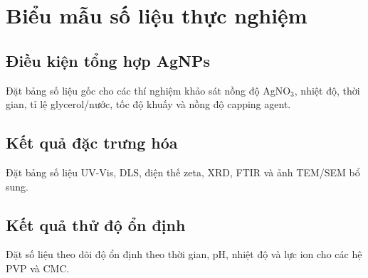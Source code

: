 \chapter{Biểu mẫu số liệu thực nghiệm}

\section{Điều kiện tổng hợp AgNPs}
Đặt bảng số liệu gốc cho các thí nghiệm khảo sát nồng độ AgNO$_3$, nhiệt độ, thời gian, tỉ lệ glycerol/nước, tốc độ khuấy và nồng độ capping agent.

\section{Kết quả đặc trưng hóa}
Đặt bảng số liệu UV-Vis, DLS, điện thế zeta, XRD, FTIR và ảnh TEM/SEM bổ sung.

\section{Kết quả thử độ ổn định}
Đặt số liệu theo dõi độ ổn định theo thời gian, pH, nhiệt độ và lực ion cho các hệ PVP và CMC.
